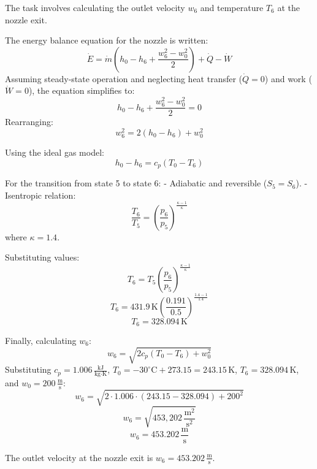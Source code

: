 The task involves calculating the outlet velocity \( w_6 \) and temperature \( T_6 \) at the nozzle exit.  

The energy balance equation for the nozzle is written:  
\[
\dot{E} = \dot{m} \left( h_0 - h_6 + \frac{w_6^2 - w_0^2}{2} \right) + \dot{Q} - \dot{W}
\]  
Assuming steady-state operation and neglecting heat transfer (\( \dot{Q} = 0 \)) and work (\( \dot{W} = 0 \)), the equation simplifies to:  
\[
h_0 - h_6 + \frac{w_6^2 - w_0^2}{2} = 0
\]  
Rearranging:  
\[
w_6^2 = 2(h_0 - h_6) + w_0^2
\]  

Using the ideal gas model:  
\[
h_0 - h_6 = c_p (T_0 - T_6)
\]  

For the transition from state 5 to state 6:  
- Adiabatic and reversible (\( S_{5} = S_{6} \)).  
- Isentropic relation:  
\[
\frac{T_6}{T_5} = \left( \frac{p_6}{p_5} \right)^{\frac{\kappa - 1}{\kappa}}
\]  
where \( \kappa = 1.4 \).  

Substituting values:  
\[
T_6 = T_5 \left( \frac{p_6}{p_5} \right)^{\frac{\kappa - 1}{\kappa}}
\]  
\[
T_6 = 431.9 \, \text{K} \left( \frac{0.191}{0.5} \right)^{\frac{1.4 - 1}{1.4}}
\]  
\[
T_6 = 328.094 \, \text{K}
\]  

Finally, calculating \( w_6 \):  
\[
w_6 = \sqrt{2 c_p (T_0 - T_6) + w_0^2}
\]  
Substituting \( c_p = 1.006 \, \frac{\text{kJ}}{\text{kg·K}} \), \( T_0 = -30^\circ\text{C} + 273.15 = 243.15 \, \text{K} \), \( T_6 = 328.094 \, \text{K} \), and \( w_0 = 200 \, \frac{\text{m}}{\text{s}} \):  
\[
w_6 = \sqrt{2 \cdot 1.006 \cdot (243.15 - 328.094) + 200^2}
\]  
\[
w_6 = \sqrt{453,202 \, \frac{\text{m}^2}{\text{s}^2}}
\]  
\[
w_6 = 453.202 \, \frac{\text{m}}{\text{s}}
\]  

The outlet velocity at the nozzle exit is \( w_6 = 453.202 \, \frac{\text{m}}{\text{s}} \).